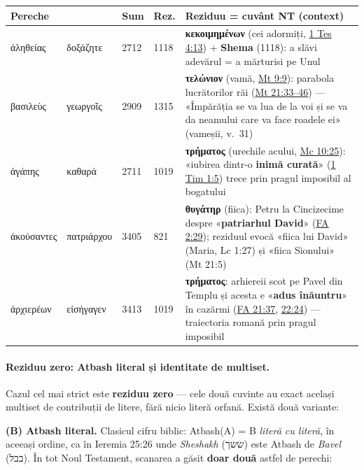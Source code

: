 \documentclass[12pt,a4paper,twoside,openany]{book}
\begin{document}
\begin{center}
\footnotesize
\begin{tabular}{L{2.5cm}L{2.5cm}C{0.8cm}C{1cm}L{6.5cm}}
\toprule
{}
\textbf{Pereche} & & \textbf{Sum} & \textbf{Rez.} & \textbf{Reziduu = cuvânt NT (context)} \\
\midrule
ἀληθείας & δοξάζητε & 2712 & 1118 & \textbf{κεκοιμημένων} (cei adormiți, \href{https://bibliaortodoxa.ro/carte.php?id=61\&cap=4\#13}{1 Tes 4:13}) + \textbf{Shema} (1118): a slăvi adevărul = a mărturisi pe Unul \\
βασιλεὺς & γεωργοῖς & 2909 & 1315 & \textbf{τελώνιον} (vamă, \href{https://bibliaortodoxa.ro/carte.php?id=55\&cap=9\#9}{Mt 9:9}): parabola lucrătorilor răi (\href{https://bibliaortodoxa.ro/carte.php?id=55\&cap=21\#33}{Mt 21:33--46}) — «Împărăția se va lua de la voi și se va da neamului care va face roadele ei» (vameșii, v.~31) \\
ἀγάπης & καθαρά & 2711 & 1019 & \textbf{τρήματος} (urechile acului, \href{https://bibliaortodoxa.ro/carte.php?id=53\&cap=10\#25}{Mc 10:25}): «iubirea dintr-o \textbf{inimă curată}» (\href{https://bibliaortodoxa.ro/carte.php?id=60\&cap=1\#5}{1 Tim 1:5}) trece prin pragul imposibil al bogatului \\
ἀκούσαντες & πατριάρχου & 3405 & 821 & \textbf{θυγάτηρ} (fiica): Petru la Cincizecime despre «\textbf{patriarhul David}» (\href{https://bibliaortodoxa.ro/carte.php?id=51\&cap=2\#29}{FA 2:29}); reziduul evocă «fiica lui David» (Maria, Lc 1:27) și «fiica Sionului» (Mt 21:5) \\
ἀρχιερέων & εἰσήγαγεν & 3413 & 1019 & \textbf{τρήματος}: arhiereii scot pe Pavel din Templu și acesta e «\textbf{adus înăuntru}» în cazărmi (\href{https://bibliaortodoxa.ro/carte.php?id=51\&cap=21\#37}{FA 21:37}, \href{https://bibliaortodoxa.ro/carte.php?id=51\&cap=22\#24}{22:24}) — traiectoria romană prin pragul imposibil \\
\bottomrule
\end{tabular}
\end{center}

\paragraph*{Reziduu zero: Atbash literal și identitate de multiset.} Cazul cel mai strict este \textbf{reziduu zero} --- cele două cuvinte au exact același multiset de contribuții de litere, fără nicio literă orfană. Există două variante:

\textbf{(B) Atbash literal.} Clasicul cifru biblic: Atbash(A) = B \textit{literă cu literă}, în aceeași ordine, ca în Ieremia 25:26 unde \textit{Sheshakh} (ששך) este Atbash de \textit{Bavel} (בבל). În tot Noul Testament, scanarea a găsit \textbf{doar două} astfel de perechi:
\end{document}
